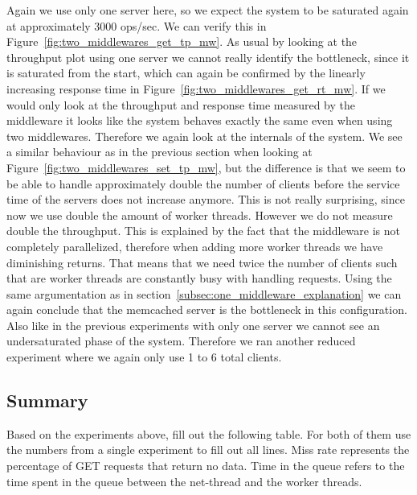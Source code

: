 \documentclass[11pt,a4paper]{article}
\begin{document}
Again we use only one server here, so we expect the system to be saturated again at approximately 3000 ops/sec.
%
We can verify this in Figure~\ref{fig:two_middlewares_get_tp_mw}.
%
As usual by looking at the throughput plot using one server we cannot really identify the bottleneck, since it is saturated from the start, which can again be confirmed by the linearly increasing response time in Figure~\ref{fig:two_middlewares_get_rt_mw}.
%
If we would only look at the throughput and response time measured by the middleware it looks like the system behaves exactly the same even when using two middlewares.
%
Therefore we again look at the internals of the system.
%
We see a similar behaviour as in the previous section when looking at Figure~\ref{fig:two_middlewares_set_tp_mw}, but the difference is that we seem to be able to handle approximately double the number of clients before the service time of the servers does not increase anymore.
%
This is not really surprising, since now we use double the amount of worker threads.
%
However we do not measure double the throughput.
%
This is explained by the fact that the middleware is not completely parallelized, therefore when adding more worker threads we have diminishing returns.
%
That means that we need twice the number of clients such that are worker threads are constantly busy with handling requests.
%
Using the same argumentation as in section~\ref{subsec:one_middleware_explanation} we can again conclude that the memcached server is the bottleneck in this configuration.
%
Also like in the previous experiments with only one server we cannot see an undersaturated phase of the system.
%
Therefore we ran another reduced experiment where we again only use 1 to 6 total clients.
%
%
\subsection{Summary}

Based on the experiments above, fill out the following table. For both of them use the numbers from a single experiment to fill out all lines. Miss rate represents the percentage of GET requests that return no data. Time in the queue refers to the time spent in the queue between the net-thread and the worker threads.
\end{document}
